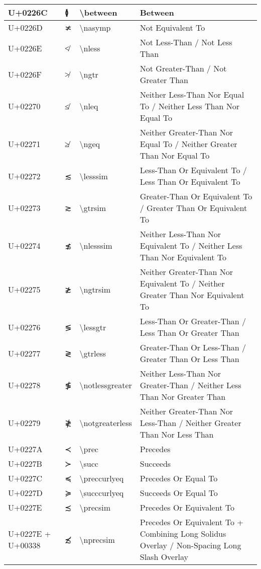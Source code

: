 \begin{table}[h]
\begin{tabulary}{\linewidth}{|L|L|L|L|}
\hline
U+0226C & ≬ & {\textbackslash}between & Between \\
\hline
U+0226D & ≭ & {\textbackslash}nasymp & Not Equivalent To \\
\hline
U+0226E & ≮ & {\textbackslash}nless & Not Less-Than / Not Less Than \\
\hline
U+0226F & ≯ & {\textbackslash}ngtr & Not Greater-Than / Not Greater Than \\
\hline
U+02270 & ≰ & {\textbackslash}nleq & Neither Less-Than Nor Equal To / Neither Less Than Nor Equal To \\
\hline
U+02271 & ≱ & {\textbackslash}ngeq & Neither Greater-Than Nor Equal To / Neither Greater Than Nor Equal To \\
\hline
U+02272 & ≲ & {\textbackslash}lesssim & Less-Than Or Equivalent To / Less Than Or Equivalent To \\
\hline
U+02273 & ≳ & {\textbackslash}gtrsim & Greater-Than Or Equivalent To / Greater Than Or Equivalent To \\
\hline
U+02274 & ≴ & {\textbackslash}nlesssim & Neither Less-Than Nor Equivalent To / Neither Less Than Nor Equivalent To \\
\hline
U+02275 & ≵ & {\textbackslash}ngtrsim & Neither Greater-Than Nor Equivalent To / Neither Greater Than Nor Equivalent To \\
\hline
U+02276 & ≶ & {\textbackslash}lessgtr & Less-Than Or Greater-Than / Less Than Or Greater Than \\
\hline
U+02277 & ≷ & {\textbackslash}gtrless & Greater-Than Or Less-Than / Greater Than Or Less Than \\
\hline
U+02278 & ≸ & {\textbackslash}notlessgreater & Neither Less-Than Nor Greater-Than / Neither Less Than Nor Greater Than \\
\hline
U+02279 & ≹ & {\textbackslash}notgreaterless & Neither Greater-Than Nor Less-Than / Neither Greater Than Nor Less Than \\
\hline
U+0227A & ≺ & {\textbackslash}prec & Precedes \\
\hline
U+0227B & ≻ & {\textbackslash}succ & Succeeds \\
\hline
U+0227C & ≼ & {\textbackslash}preccurlyeq & Precedes Or Equal To \\
\hline
U+0227D & ≽ & {\textbackslash}succcurlyeq & Succeeds Or Equal To \\
\hline
U+0227E & ≾ & {\textbackslash}precsim & Precedes Or Equivalent To \\
\hline
U+0227E + U+00338 & ≾̸ & {\textbackslash}nprecsim & Precedes Or Equivalent To + Combining Long Solidus Overlay / Non-Spacing Long Slash Overlay \\

\end{tabulary}
\end{table}
